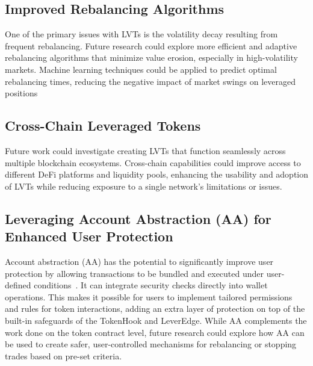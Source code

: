\subsection{Improved Rebalancing Algorithms}
One of the primary issues with LVTs is the volatility decay resulting from frequent rebalancing. Future research could explore more efficient and adaptive rebalancing algorithms that minimize value erosion, especially in high-volatility markets. Machine learning techniques could be applied to predict optimal rebalancing times, reducing the negative impact of market swings on leveraged positions

\subsection{Cross-Chain Leveraged Tokens}
Future work could investigate creating LVTs that function seamlessly across multiple blockchain ecosystems. Cross-chain capabilities could improve access to different DeFi platforms and liquidity pools, enhancing the usability and adoption of LVTs while reducing exposure to a single network's limitations or issues.

\subsection{Leveraging Account Abstraction (AA) for Enhanced User Protection}
Account abstraction (AA) has the potential to significantly improve user protection by allowing transactions to be bundled and executed under user-defined conditions~\cite{Ethereum_AA}. It can integrate security checks directly into wallet operations. This makes it possible for users to implement tailored permissions and rules for token interactions, adding an extra layer of protection on top of the built-in safeguards of the TokenHook and LeverEdge. While AA complements the work done on the token contract level, future research could explore how AA can be used to create safer, user-controlled mechanisms for rebalancing or stopping trades based on pre-set criteria.